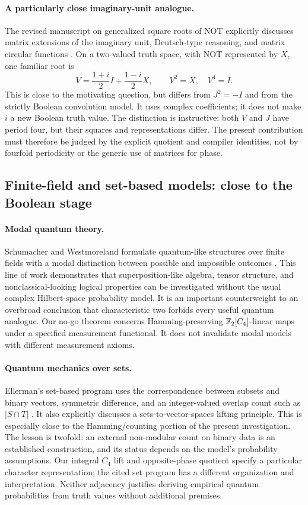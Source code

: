 \paragraph{A particularly close imaginary-unit analogue.}
The revised manuscript on generalized square roots of NOT explicitly discusses matrix extensions of the imaginary unit, Deutsch-type reasoning, and matrix circular functions \cite{mizraji2024}. On a two-valued truth space, with NOT represented by $X$, one familiar root is
\begin{equation}
 V=\frac{1+i}{2}I+\frac{1-i}{2}X,\qquad V^2=X,\quad V^4=I.
\end{equation}
This is close to the motivating question, but differs from $J^2=-I$ and from the strictly Boolean convolution model. It uses complex coefficients; it does not make $i$ a new Boolean truth value. The distinction is instructive: both $V$ and $J$ have period four, but their squares and representations differ. The present contribution must therefore be judged by the explicit quotient and compiler identities, not by fourfold periodicity or the generic use of matrices for phase.

\subsection{Finite-field and set-based models: close to the Boolean stage}
\paragraph{Modal quantum theory.}
Schumacher and Westmoreland formulate quantum-like structures over finite fields with a modal distinction between possible and impossible outcomes \cite{modal}. This line of work demonstrates that superposition-like algebra, tensor structure, and nonclassical-looking logical properties can be investigated without the usual complex Hilbert-space probability model. It is an important counterweight to an overbroad conclusion that characteristic two forbids every useful quantum analogue. Our no-go theorem concerns Hamming-preserving $\mathbb F_2[C_4]$-linear maps under a specified measurement functional. It does not invalidate modal models with different measurement axioms.

\paragraph{Quantum mechanics over sets.}
Ellerman's set-based program uses the correspondence between subsets and binary vectors, symmetric difference, and an integer-valued overlap count such as $|S\cap T|$ \cite{ellerman}. It also explicitly discusses a sets-to-vector-spaces lifting principle. This is especially close to the Hamming/counting portion of the present investigation. The lesson is twofold: an external non-modular count on binary data is an established construction, and its status depends on the model's probability assumptions. Our integral $C_4$ lift and opposite-phase quotient specify a particular character representation; the cited set program has a different organization and interpretation. Neither adjacency justifies deriving empirical quantum probabilities from truth values without additional premises.

